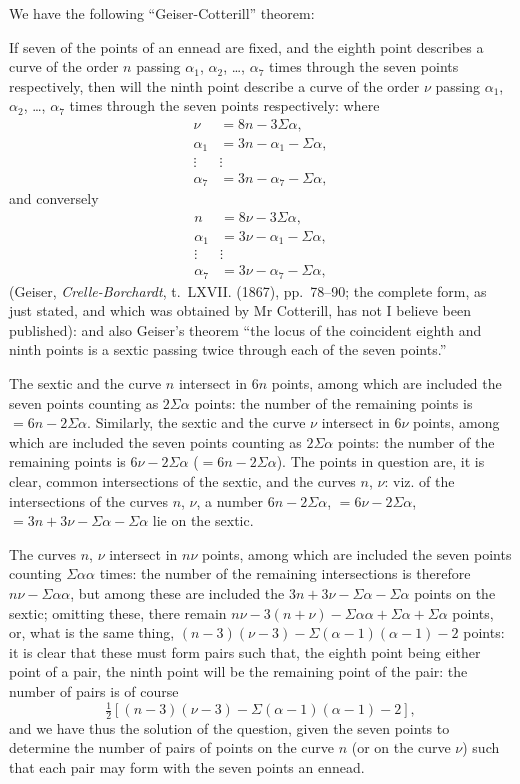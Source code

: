 \documentclass[11pt,a4paper]{book}
\begin{document}
We have the following ``Geiser-Cotterill'' theorem:

If seven of the points of an ennead are fixed, and the eighth point describes a curve of the order $n$ passing $\alpha_1$, $\alpha_2$, \ldots, $\alpha_7$ times through the seven points respectively, then will the ninth point describe a curve of the order $\nu$ passing $\alpha_1$, $\alpha_2$, \ldots, $\alpha_7$ times through the seven points respectively: where
\begin{align*}
\nu &= 8n - 3\Sigma\alpha,\\
\alpha_1 &= 3n - \alpha_1 - \Sigma\alpha,\\
\vdots\ &\vdots\\
\alpha_7 &= 3n - \alpha_7 - \Sigma\alpha,
\end{align*}
and conversely
\begin{align*}
n &= 8\nu - 3\Sigma\alpha,\\
\alpha_1 &= 3\nu - \alpha_1 - \Sigma\alpha,\\
\vdots\ &\vdots\\
\alpha_7 &= 3\nu - \alpha_7 - \Sigma\alpha,
\end{align*}
(Geiser, \textit{Crelle-Borchardt}, t.~LXVII. (1867), pp.~78--90; the complete form, as just stated, and which was obtained by Mr Cotterill, has not I believe been published): and also Geiser's theorem ``the locus of the coincident eighth and ninth points is a sextic passing twice through each of the seven points.''

The sextic and the curve $n$ intersect in $6n$ points, among which are included the seven points counting as $2\Sigma\alpha$ points: the number of the remaining points is $= 6n - 2\Sigma\alpha$. Similarly, the sextic and the curve $\nu$ intersect in $6\nu$ points, among which are included the seven points counting as $2\Sigma\alpha$ points: the number of the remaining points is $6\nu - 2\Sigma\alpha$ ($= 6n - 2\Sigma\alpha$). The points in question are, it is clear, common intersections of the sextic, and the curves $n$, $\nu$: viz. of the intersections of the curves $n$, $\nu$, a number $6n - 2\Sigma\alpha$, $= 6\nu - 2\Sigma\alpha$, $= 3n + 3\nu - \Sigma\alpha - \Sigma\alpha$ lie on the sextic.

The curves $n$, $\nu$ intersect in $n\nu$ points, among which are included the seven points counting $\Sigma\alpha\alpha$ times: the number of the remaining intersections is therefore $n\nu - \Sigma\alpha\alpha$, but among these are included the $3n + 3\nu - \Sigma\alpha - \Sigma\alpha$ points on the sextic; omitting these, there remain $n\nu - 3(n + \nu) - \Sigma\alpha\alpha + \Sigma\alpha + \Sigma\alpha$ points, or, what is the same thing, $(n-3)(\nu-3) - \Sigma(\alpha-1)(\alpha-1) - 2$ points: it is clear that these must form pairs such that, the eighth point being either point of a pair, the ninth point will be the remaining point of the pair: the number of pairs is of course
\[
\tfrac{1}{2}[(n-3)(\nu-3) - \Sigma(\alpha-1)(\alpha-1) - 2],
\]
and we have thus the solution of the question, given the seven points to determine the number of pairs of points on the curve $n$ (or on the curve $\nu$) such that each pair may form with the seven points an ennead.
\end{document}
